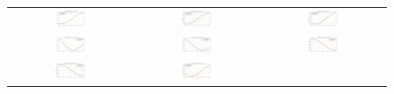 \begin{figure}[ht]
  \centering
  \begin{tabular}{ccc}
    \includegraphics[width=0.3\textwidth]{images/gnn_obs_naive_j1_jj1_0.png} &
    \includegraphics[width=0.3\textwidth]{images/gnn_obs_naive_j1_jj1_1.png} &
    \includegraphics[width=0.3\textwidth]{images/gnn_obs_naive_j1_jj1_2.png} \\
    \includegraphics[width=0.3\textwidth]{images/gnn_obs_naive_j1_jj1_3.png} &
    \includegraphics[width=0.3\textwidth]{images/gnn_obs_naive_j1_jj1_4.png} &
    \includegraphics[width=0.3\textwidth]{images/gnn_obs_naive_j1_jj1_5.png} \\
    \includegraphics[width=0.3\textwidth]{images/gnn_obs_naive_j1_jj1_6.png} &
    \includegraphics[width=0.3\textwidth]{images/gnn_obs_naive_j1_jj1_7.png} &

\end{tabular}
\end{figure}
